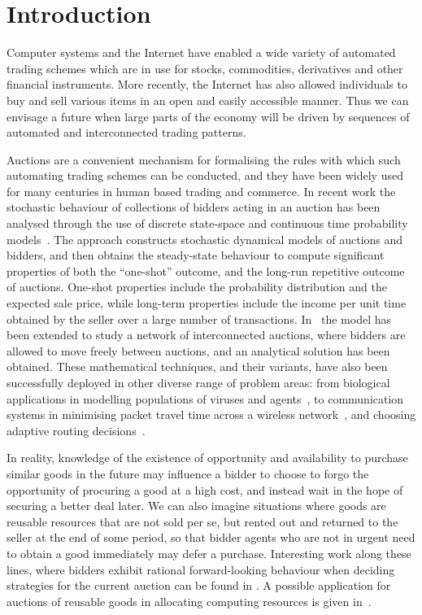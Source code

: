 \documentclass{comjnl}
\begin{document}
\maketitle


\section{Introduction}

Computer systems and the Internet have enabled a wide variety of
automated trading schemes which are in use for stocks,
commodities, derivatives and other financial instruments. More
recently, the Internet has also allowed individuals to buy and
sell various items in an open and easily accessible manner. Thus
we can envisage a future when large parts of the economy will be
driven by sequences of automated and interconnected trading
patterns.

Auctions are a convenient mechanism for formalising the rules with
which such automating trading schemes can be conducted, and they
have been widely used for many centuries in human based trading
and commerce. In recent work the stochastic behaviour of
collections of bidders acting in an auction has been analysed
through the use of discrete state-space and continuous time
probability models~\cite{gelenbe06}. The approach constructs
stochastic dynamical models of auctions and bidders, and then
obtains the steady-state behaviour to compute significant
properties of both the ``one-shot'' outcome, and the long-run
repetitive outcome of auctions. One-shot properties include the
probability distribution and the expected sale price, while
long-term properties include the income per unit time obtained by
the seller over a large number of transactions.
In~\cite{gelenbe_inPress} the model has been extended to study a
network of interconnected auctions, where bidders are allowed to
move freely between auctions, and an analytical solution has been
obtained. These mathematical techniques, and their variants, have
also been successfully deployed in other diverse range of problem
areas: from biological applications in modelling populations of
viruses and agents~\cite{Gelenbe-SoftwareViruses}, to
communication systems in minimising packet travel time across a
wireless network~\cite{Gelenbe07_DiffModelPacketTravel,
Gelenbe_06_Workshop_TravelDelay}, and choosing adaptive routing
decisions~\cite{Gelenbe03_Sensible}.

In reality, knowledge of the existence of opportunity and
availability to purchase similar goods in the future may influence
a bidder to choose to forgo the opportunity of procuring a good at
a high cost, and instead wait in the hope of securing a better
deal later. We can also imagine situations where goods are
reusable resources that are not sold per se, but rented out and
returned to the seller at the end of some period, so that bidder
agents who are not in urgent need to obtain a good immediately may
defer a purchase. Interesting work along these lines, where
bidders exhibit rational forward-looking behaviour when deciding
strategies for the current auction can be found in
\cite{zeithammer06}. A possible application for auctions of
reusable goods in allocating computing resources is given
in~\cite{gagliano_etal_95}.
\end{document}
